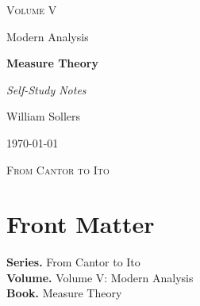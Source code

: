 \documentclass[12pt, a4paper]{report}
\begin{document}
\ExplSyntaxOff
\renewcommand{\familydefault}{\rmdefault}

\begin{titlepage}
\centering
\vspace*{3.5cm}

{\Large\scshape Volume V\par}
\vspace{0.35cm}
{\large Modern Analysis\par}

\vspace{1.4cm}

{\Huge\bfseries Measure Theory\par}

\vspace{0.6cm}
{\large\itshape Self-Study Notes\par}

\vfill

{\large William Sollers\par}
\vspace{0.35cm}
{\large \today\par}

\vfill

{\large\scshape From Cantor to Ito\par}
\end{titlepage}

\clearpage
\thispagestyle{plain}
\chapter*{Front Matter}
\noindent\textbf{Series.} From Cantor to Ito\\[0.5em]
\textbf{Volume.} Volume V: Modern Analysis\\[0.5em]
\textbf{Book.} Measure Theory

\clearpage
\tableofcontents
\clearpage
{}



\clearpage



\printindex[tech]
\printindex[dep]
\end{document}
